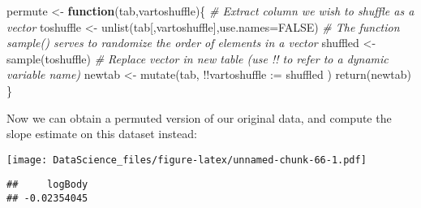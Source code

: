 \documentclass[
]{book}
\newenvironment{Shaded}{\begin{snugshade}}{\end{snugshade}}
\newcommand{\AttributeTok}[1]{\textcolor[rgb]{0.77,0.63,0.00}{#1}}
\newcommand{\CommentTok}[1]{\textcolor[rgb]{0.56,0.35,0.01}{\textit{#1}}}
\newcommand{\ConstantTok}[1]{\textcolor[rgb]{0.00,0.00,0.00}{#1}}
\newcommand{\ControlFlowTok}[1]{\textcolor[rgb]{0.13,0.29,0.53}{\textbf{#1}}}
\newcommand{\DecValTok}[1]{\textcolor[rgb]{0.00,0.00,0.81}{#1}}
\newcommand{\FunctionTok}[1]{\textcolor[rgb]{0.00,0.00,0.00}{#1}}
\newcommand{\NormalTok}[1]{#1}
\newcommand{\OtherTok}[1]{\textcolor[rgb]{0.56,0.35,0.01}{#1}}
\newcommand{\SpecialCharTok}[1]{\textcolor[rgb]{0.00,0.00,0.00}{#1}}
\newcommand{\StringTok}[1]{\textcolor[rgb]{0.31,0.60,0.02}{#1}}
\begin{document}
\begin{Shaded}
\begin{Highlighting}[]
\NormalTok{permute }\OtherTok{\textless{}{-}} \ControlFlowTok{function}\NormalTok{(tab,vartoshuffle)\{}
  \CommentTok{\# Extract column we wish to shuffle as a vector}
\NormalTok{  toshuffle }\OtherTok{\textless{}{-}} \FunctionTok{unlist}\NormalTok{(tab[,vartoshuffle],}\AttributeTok{use.names=}\ConstantTok{FALSE}\NormalTok{)}
  \CommentTok{\# The function sample() serves to randomize the order of elements in a vector}
\NormalTok{  shuffled }\OtherTok{\textless{}{-}} \FunctionTok{sample}\NormalTok{(toshuffle)}
  \CommentTok{\# Replace vector in new table (use !! to refer to a dynamic variable name)}
\NormalTok{  newtab }\OtherTok{\textless{}{-}} \FunctionTok{mutate}\NormalTok{(tab, }\SpecialCharTok{!!}\AttributeTok{vartoshuffle :=}\NormalTok{ shuffled )}
  \FunctionTok{return}\NormalTok{(newtab)}
\NormalTok{\}}
\end{Highlighting}
\end{Shaded}

Now we can obtain a permuted version of our original data, and compute the slope estimate on this dataset instead:

\begin{Shaded}
\end{Shaded}

\texttt{[image: DataScience\_files/figure-latex/unnamed-chunk-66-1.pdf]}

\begin{Shaded}
\end{Shaded}

\begin{verbatim}
##     logBody 
## -0.02354045
\end{verbatim}
\end{document}
